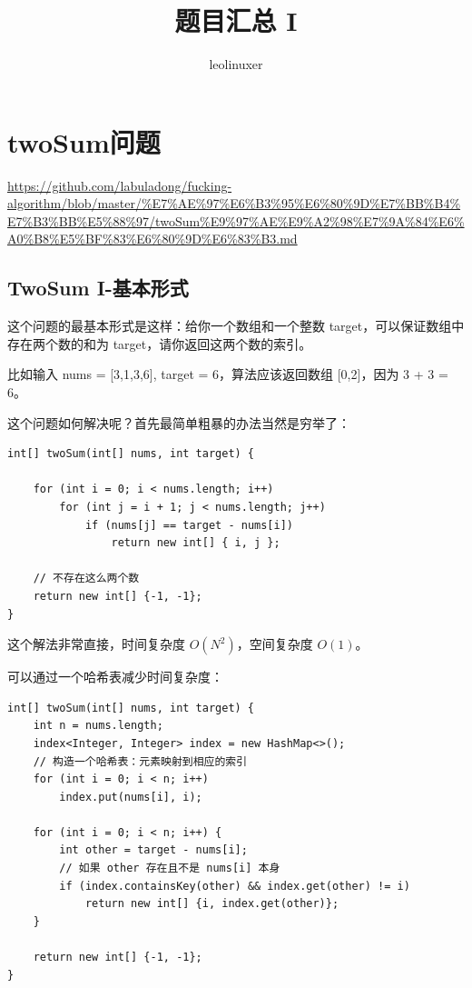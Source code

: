 \documentclass[12pt]{article}
\title{题目汇总 I}
\author{leolinuxer}
\begin{document}
\maketitle
\tableofcontents

\section{twoSum问题}
\url{https://github.com/labuladong/fucking-algorithm/blob/master/%E7%AE%97%E6%B3%95%E6%80%9D%E7%BB%B4%E7%B3%BB%E5%88%97/twoSum%E9%97%AE%E9%A2%98%E7%9A%84%E6%A0%B8%E5%BF%83%E6%80%9D%E6%83%B3.md}

\subsection{TwoSum I-基本形式}
这个问题的最基本形式是这样：给你一个数组和一个整数 target，可以保证数组中存在两个数的和为 target，请你返回这两个数的索引。

比如输入 nums = [3,1,3,6], target = 6，算法应该返回数组 [0,2]，因为 3 + 3 = 6。

这个问题如何解决呢？首先最简单粗暴的办法当然是穷举了：

\begin{lstlisting}
int[] twoSum(int[] nums, int target) {

    for (int i = 0; i < nums.length; i++) 
        for (int j = i + 1; j < nums.length; j++) 
            if (nums[j] == target - nums[i]) 
                return new int[] { i, j };

    // 不存在这么两个数
    return new int[] {-1, -1};
}
\end{lstlisting}

这个解法非常直接，时间复杂度 $O(N^2)$，空间复杂度 $O(1)$。

可以通过一个哈希表减少时间复杂度：
\begin{lstlisting}
int[] twoSum(int[] nums, int target) {
    int n = nums.length;
    index<Integer, Integer> index = new HashMap<>();
    // 构造一个哈希表：元素映射到相应的索引
    for (int i = 0; i < n; i++)
        index.put(nums[i], i);
    
    for (int i = 0; i < n; i++) {
        int other = target - nums[i];
        // 如果 other 存在且不是 nums[i] 本身
        if (index.containsKey(other) && index.get(other) != i)
            return new int[] {i, index.get(other)};
    }
    
    return new int[] {-1, -1};
}
\end{lstlisting}
\end{document}
